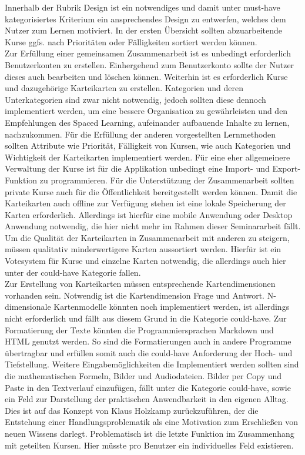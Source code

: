 Innerhalb der Rubrik Design ist ein notwendiges und damit unter must-have kategorisiertes Kriterium ein ansprechendes Design zu entwerfen, welches dem Nutzer zum Lernen motiviert. 
In der ersten Übersicht sollten abzuarbeitende Kurse ggfs. nach Prioritäten oder Fälligkeiten sortiert werden können. \\

Zur Erfüllung einer gemeinsamen Zusammenarbeit ist es unbedingt erforderlich Benutzerkonten zu erstellen. Einhergehend zum Benutzerkonto sollte der Nutzer dieses auch bearbeiten und löschen können. Weiterhin ist es erforderlich Kurse und dazugehörige Karteikarten zu erstellen. Kategorien und deren Unterkategorien sind zwar nicht notwendig, jedoch sollten diese dennoch implementiert werden, um eine bessere Organisation zu gewährleisten und den Empfehlungen des Spaced Learning, aufeinander aufbauende Inhalte zu lernen, nachzukommen. Für die Erfüllung der anderen vorgestellten Lernmethoden sollten Attribute wie Priorität, Fälligkeit von Kursen, wie auch Kategorien und Wichtigkeit der Karteikarten implementiert werden. Für eine eher allgemeinere Verwaltung der Kurse ist für die Applikation unbedingt eine Import- und Export-Funktion zu programmieren. Für die Unterstützung der Zusammenarbeit sollten private Kurse auch für die Öffentlichkeit bereitgestellt werden können. Damit die Karteikarten auch offline zur Verfügung stehen ist eine lokale Speicherung der Karten erforderlich. Allerdings ist hierfür eine mobile Anwendung oder Desktop Anwendung notwendig, die hier nicht mehr im Rahmen dieser Seminararbeit fällt. Um die Qualität der Karteikarten in Zusammenarbeit mit anderen zu steigern, müssen qualitativ minderwertigere Karten aussortiert werden. Hierfür ist ein Votesystem für Kurse und einzelne Karten notwendig, die allerdings auch hier unter der could-have Kategorie fallen.\\

Zur Erstellung von Karteikarten müssen entsprechende Kartendimensionen vorhanden sein. Notwendig ist die Kartendimension Frage und Antwort. N-dimensionale Kartenmodelle könnten noch implementiert werden, ist allerdings nicht erforderlich und fällt aus diesem Grund in die Kategorie could-have. Zur Formatierung der Texte könnten die Programmiersprachen Markdown und HTML genutzt werden. So sind die Formatierungen auch in andere Programme übertragbar und erfüllen somit auch die could-have Anforderung der Hoch- und Tiefstellung. Weitere Eingabemöglichkeiten die Implementiert werden sollten sind die mathematischen Formeln, Bilder und Audiodateien. Bilder per Copy und Paste in den Textverlauf einzufügen, fällt unter die Kategorie could-have, sowie ein Feld zur Darstellung der praktischen Anwendbarkeit in den eigenen Alltag. Dies ist auf das Konzept von Klaus Holzkamp zurückzuführen, der die Entstehung einer Handlungsproblematik als eine Motivation zum Erschließen von neuen Wissens darlegt. Problematisch ist die letzte Funktion im Zusammenhang mit geteilten Kursen. Hier müsste pro Benutzer ein individuelles Feld existieren. \\

